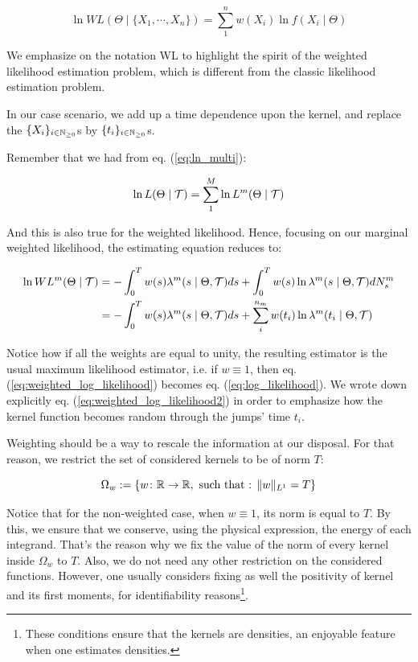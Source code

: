 \documentclass[11pt]{book}
\newcommand{\sequence}[1]{\{ #1 \}_{ i \in \N} }
\begin{document}
\begin{equation}
\ln W L ( \Theta \mid \{ X_1, \cdots, X_n \} ) = \sum_1^n  w(X_i) \ln f( X_i \mid \Theta ) 
\end{equation}

We emphasize on the notation WL to highlight the spirit of the weighted likelihood estimation problem, which is different from the classic likelihood estimation problem.


In our case scenario, we add up a time dependence upon the kernel, and replace the $\sequence{X_i}$s by $\sequence{t_i}$s.


Remember that we had from eq. (\ref{eq:ln_multi}):
 
\begin{equation}
\ln L( \Theta \mid \mathcal{T} ) = \sum_1^M \ln L^m( \Theta \mid \mathcal{T} )
\end{equation}

And this is also true for the weighted likelihood. Hence, focusing on our marginal weighted likelihood, the estimating equation reduces to:



\begin{align}
\ln W L^m( \Theta \mid \mathcal{T} ) &= - \int_0^T w(s) \lambda^{m} ( s \mid \Theta , \mathcal{T} ) ds + \int_0^T w(s) \ln \lambda^{m} ( s \mid \Theta , \mathcal{T} ) d N_s^m  
\label{eq:weighted_log_likelihood} \\
&=  - \int_0^T w(s) \lambda^{m} ( s \mid \Theta , \mathcal{T} )  ds +  \sum^{n_m}_i  w(t_i) \ln \lambda^{m} ( t_i \mid \Theta , \mathcal{T} )  \label{eq:weighted_log_likelihood2} 
\end{align}

Notice how if all the weights are equal to unity, the resulting estimator is the usual maximum likelihood estimator, i.e. if $w \equiv 1$, then eq. (\ref{eq:weighted_log_likelihood}) becomes eq. (\ref{eq:log_likelihood}). We wrote down explicitly eq. (\ref{eq:weighted_log_likelihood2}) in order to emphasize how the kernel function becomes random through the jumps' time $t_i$. 

Weighting should be a way to rescale the information at our disposal. For that reason, we restrict the set of considered kernels to be of norm $T$:

$$\Omega_w := \{ w \colon \mathbb R \to \mathbb R, \text{ such that : } \lVert w\rVert_{L^1 } = T \} $$

Notice that for the non-weighted case, when $w \equiv 1$, its norm is equal to $T$. By this, we ensure that we conserve, using the physical expression, the energy of each integrand. That's the reason why we fix the value of the norm of every kernel inside $\Omega_w$ to $T$. Also, we do not need any other restriction on the considered functions. However, one usually considers fixing as well the positivity of kernel and its first moments, for identifiability reasons\footnote{These conditions ensure that the kernels are densities, an enjoyable feature when one estimates densities.}. 
\end{document}
